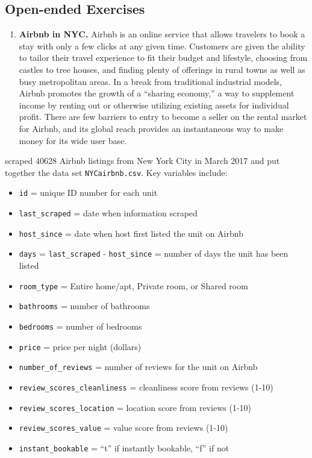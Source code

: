 \documentclass[
]{krantz}
\providecommand{\tightlist}{%
  \setlength{\itemsep}{0pt}\setlength{\parskip}{0pt}}
\begin{document}
\hypertarget{open-ended-exercises-1}{%
\subsection{Open-ended Exercises}\label{open-ended-exercises-1}}

\begin{enumerate}
\def\labelenumi{\arabic{enumi}.}
\tightlist
\item
  \textbf{Airbnb in NYC.} Airbnb is an online service that allows travelers to book a stay with only a few clicks at any given time. Customers are given the ability to tailor their travel experience to fit their budget and lifestyle, choosing from castles to tree houses, and finding plenty of offerings in rural towns as well as busy metropolitan areas. In a break from traditional industrial models, Airbnb promotes the growth of a ``sharing economy,'' a way to supplement income by renting out or otherwise utilizing existing assets for individual profit. There are few barriers to entry to become a seller on the rental market for Airbnb, and its global reach provides an instantaneous way to make money for its wide user base.
\end{enumerate}

\citet{Awad2017} scraped 40628 Airbnb listings from New York City in March 2017 and put together the data set \texttt{NYCairbnb.csv}. Key variables include:

\begin{itemize}
\tightlist
\item
  \texttt{id} = unique ID number for each unit
\item
  \texttt{last\_scraped} = date when information scraped
\item
  \texttt{host\_since} = date when host first listed the unit on Airbnb
\item
  \texttt{days} = \texttt{last\_scraped} - \texttt{host\_since} = number of days the unit has been listed
\item
  \texttt{room\_type} = Entire home/apt, Private room, or Shared room
\item
  \texttt{bathrooms} = number of bathrooms
\item
  \texttt{bedrooms} = number of bedrooms
\item
  \texttt{price} = price per night (dollars)
\item
  \texttt{number\_of\_reviews} = number of reviews for the unit on Airbnb
\item
  \texttt{review\_scores\_cleanliness} = cleanliness score from reviews (1-10)
\item
  \texttt{review\_scores\_location} = location score from reviews (1-10)
\item
  \texttt{review\_scores\_value} = value score from reviews (1-10)
\item
  \texttt{instant\_bookable} = ``t'' if instantly bookable, ``f'' if not
\end{itemize}
\end{document}
